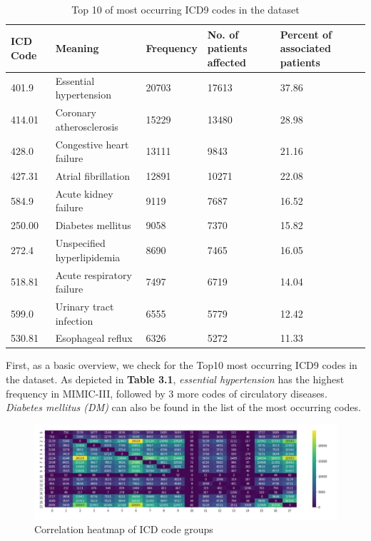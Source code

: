 \documentclass[11pt, a4paper]{book}
\begin{document}
\begin{table}
\begin{tabular}{l|l|l|l|l}
ICD Code & Meaning & Frequency & No. of patients affected & Percent of associated patients \\
\hline
401.9 & Essential hypertension & 20703 & 17613 & 37.86\\
414.01 &  Coronary atherosclerosis & 15229 & 13480 & 28.98 \\
428.0 & Congestive heart failure &   13111 & 9843 &21.16\\
427.31 & Atrial fibrillation&    12891 & 10271 &  22.08\\
584.9 &  Acute kidney failure &  9119 & 7687& 16.52\\
250.00 & Diabetes mellitus &  9058 & 7370 & 15.82\\
272.4 & Unspecified hyperlipidemia & 8690 & 7465 & 16.05 \\
518.81 &  Acute respiratory failure & 7497 & 6719 & 14.04 \\
599.0 &   Urinary tract infection &  6555 & 5779 & 12.42 \\
530.81 & Esophageal reflux &  6326 & 5272 & 11.33\\
\end{tabular}
\caption{\label{tab:top10-codes-dataset}Top 10 of most occurring ICD9 codes in the dataset}
\end{table}


First, as a basic overview, we check for the Top10 most occurring ICD9 codes in the dataset. As depicted in \textbf{Table 3.1}, \textit{essential hypertension} has the highest frequency in MIMIC-III, followed by 3 more codes of circulatory diseases. \textit{Diabetes mellitus (DM)} can also be found in the list of the most occurring codes.

\begin{figure}
  \begin{center}
  \includegraphics[width=1\textwidth]{img/correlation-heatmap.png}
  \caption{Correlation heatmap of ICD code groups \cite{arya2019exploratory}}
  \label{fig:correlation-heatmap}
  \end{center}
\end{figure}
\end{document}
